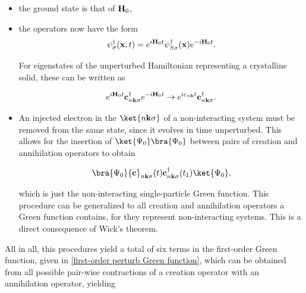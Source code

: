 \begin{itemize}
    \item the ground state is that of ${\bf H}_0$, 
    \item the operators now have the form
          $$
            \psi_\sigma^\dagger({\bf x},t) = e^{i {\bf H}_0 t} \psi_{S \sigma}^\dagger({\bf x}) e^{-i {\bf H}_0 t}.
          $$
          
          For eigenstates of the unperturbed Hamiltonian representing a crystalline solid, these can be written as 
          
           $$
            e^{i {\bf H}_0 t} {\bf c}_{n {\bf k} \sigma}^\dagger e^{-i {\bf H}_0 t} \rightarrow e^{i \varepsilon_{n {\bf k}} t}{\bf c}_{n {\bf k} \sigma}^\dagger.
          $$
          
    \item An injected electron in the $\ket{n {\bf k} \sigma}$ of a non-interacting system must be removed from the same state, since it evolves in time unperturbed. This allows for the insertion of $\ket{\Psi_0}\bra{\Psi_0}$ between pairs of creation and annihilation operators to obtain
    
    $$
        \bra{\Psi_0} {{\bf c}}_{n {{\bf k}} \sigma}(t) {{\bf c}}_{n {{\bf k}} \sigma}^\dagger(t_1) \ket{\Psi_0},
    $$
    
    which is just the non-interacting single-particle Green function. This procedure can be generalized to all creation and annihilation operators a Green function contains, for they represent non-interacting systems. This is a direct consequence of Wick's theorem. 
    
\end{itemize}

All in all, this procedures yield a total of six terms in the first-order Green function, given in \cref{first-order perturb Green function}, which can be obtained from all possible pair-wise contractions of a creation operator with an annihilation operator, yielding 

